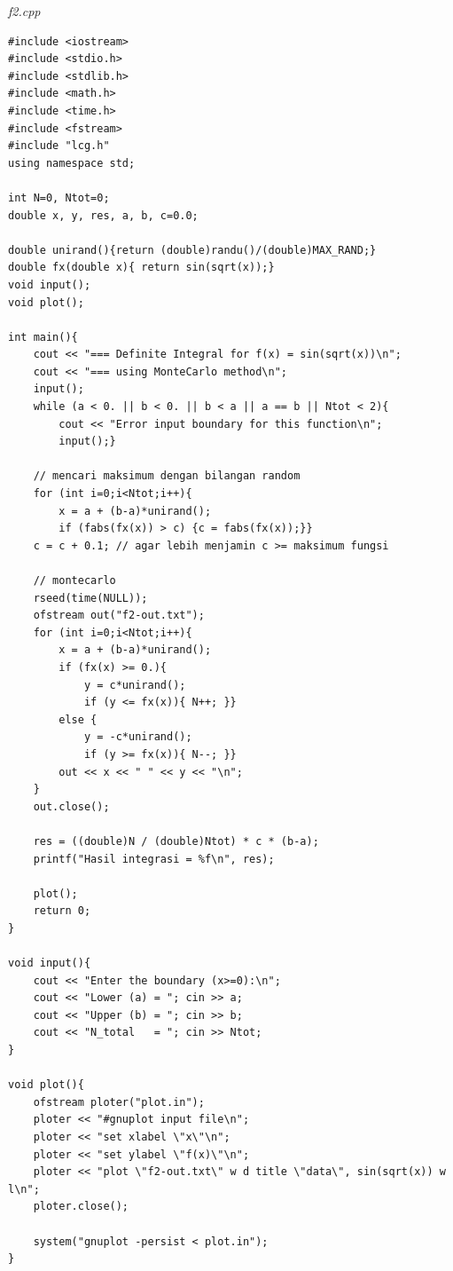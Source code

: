 \documentclass[paper=a4, fontsize=11pt]{scrartcl}
\numberwithin{equation}{section} %
\numberwithin{figure}{section} %
\numberwithin{table}{section} %
\begin{document}
\vspace{2cm}
\textit{f2.cpp}
\lstset{frameround=fttt}
\begin{lstlisting}
#include <iostream>
#include <stdio.h>
#include <stdlib.h>
#include <math.h>
#include <time.h>
#include <fstream>
#include "lcg.h"
using namespace std;

int N=0, Ntot=0;
double x, y, res, a, b, c=0.0;

double unirand(){return (double)randu()/(double)MAX_RAND;}
double fx(double x){ return sin(sqrt(x));}
void input();
void plot();

int main(){
    cout << "=== Definite Integral for f(x) = sin(sqrt(x))\n"; 
    cout << "=== using MonteCarlo method\n";    
    input();
    while (a < 0. || b < 0. || b < a || a == b || Ntot < 2){
        cout << "Error input boundary for this function\n";
        input();}
    
    // mencari maksimum dengan bilangan random
    for (int i=0;i<Ntot;i++){
        x = a + (b-a)*unirand();
        if (fabs(fx(x)) > c) {c = fabs(fx(x));}}
    c = c + 0.1; // agar lebih menjamin c >= maksimum fungsi

    // montecarlo
    rseed(time(NULL));
    ofstream out("f2-out.txt");
    for (int i=0;i<Ntot;i++){
        x = a + (b-a)*unirand();
        if (fx(x) >= 0.){
            y = c*unirand();
            if (y <= fx(x)){ N++; }}
        else {
            y = -c*unirand();
            if (y >= fx(x)){ N--; }}
        out << x << " " << y << "\n";
    }
    out.close();
    
    res = ((double)N / (double)Ntot) * c * (b-a);
    printf("Hasil integrasi = %f\n", res);

    plot();
    return 0;
}

void input(){   
    cout << "Enter the boundary (x>=0):\n";
    cout << "Lower (a) = "; cin >> a;
    cout << "Upper (b) = "; cin >> b;
    cout << "N_total   = "; cin >> Ntot;
}

void plot(){
    ofstream ploter("plot.in");
    ploter << "#gnuplot input file\n";
    ploter << "set xlabel \"x\"\n";
    ploter << "set ylabel \"f(x)\"\n";
    ploter << "plot \"f2-out.txt\" w d title \"data\", sin(sqrt(x)) w l\n";
    ploter.close();
    
    system("gnuplot -persist < plot.in");
}
\end{lstlisting}
\end{document}

